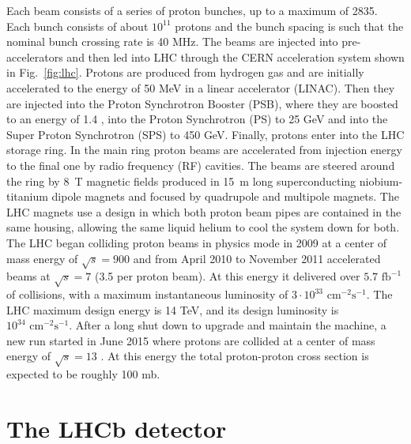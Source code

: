 Each beam consists of a series of proton bunches, up to a maximum of 2835. Each bunch consists of about $10^{11}$
protons and the bunch spacing is such that the nominal bunch crossing rate is 40 MHz. The beams are injected into
pre-accelerators and then led into LHC through the CERN acceleration system shown in Fig.~\ref{fig:lhc}. Protons are
produced from hydrogen gas and are initially accelerated to the energy of 50 MeV in a linear accelerator (LINAC).
Then they are injected into the Proton Synchrotron Booster (PSB), where they are boosted to an energy of 1.4 \gev,
into the Proton Synchrotron (PS) to 25 GeV and into the Super Proton Synchrotron (SPS) to 450 GeV. Finally, protons
enter into the LHC storage ring. In the main ring proton beams are accelerated from injection energy to the final one
by radio frequency (RF) cavities. The beams are steered around the ring by 8~T magnetic fields produced in 15~m long
superconducting niobium-titanium dipole magnets and focused by quadrupole and multipole magnets. The LHC magnets
use a design in which both proton beam pipes are contained in the same housing, allowing the same liquid helium to cool 
the system down for both. The LHC began colliding proton beams in physics mode in 2009 at a center of mass
energy of $\sqrt{s} = 900$ \gev and from April 2010 to November 2011 accelerated beams at $\sqrt{s} = 7$ \tev (3.5 \tev per
proton beam). At this energy it delivered over $5.7 \text{ fb}^{-1}$ of collisions, with a maximum instantaneous
luminosity of $3\cdot10^{33} \text{ cm}^{-2}\text{s}^{-1}$. The LHC maximum design energy is 14 TeV, and its design
luminosity is $10^{34} \text{ cm}^{-2}\text{s}^{-1}$. After a long shut down to upgrade and maintain the machine, a
new run started in June 2015 where protons are collided at a center of mass energy of $\sqrt{s} = 13$ \tev. At this
energy the total proton-proton cross section is expected to be roughly 100 mb.

\section{The LHCb detector}

